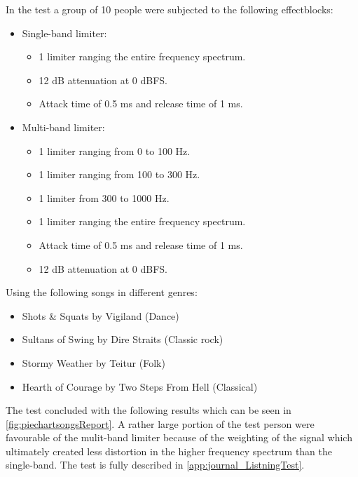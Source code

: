 In the test a group of 10 people were subjected to the following effectblocks:
 \begin{itemize}
    \item Single-band limiter:
    \begin{itemize}
    \item 1 limiter ranging the entire frequency spectrum.
    \item 12 dB attenuation at 0 dBFS.
    \item Attack time of 0.5 ms and release time of 1 ms.
    \end{itemize}
    \item Multi-band limiter:
    \begin{itemize}
    \item 1 limiter ranging from 0 to 100 Hz.
    \item 1 limiter ranging from 100 to 300 Hz.
    \item 1 limiter from 300 to 1000 Hz.
    \item 1 limiter ranging the entire frequency spectrum.
    \item Attack time of 0.5 ms and release time of 1 ms.
    \item 12 dB attenuation at 0 dBFS.
    \end{itemize}
 \end{itemize}
Using the following songs in different genres:
\begin{itemize}
\item Shots \& Squats by Vigiland (Dance)
\item Sultans of Swing by Dire Straits (Classic rock)
\item Stormy Weather by Teitur (Folk)
\item Hearth of Courage by Two Steps From Hell (Classical)
\end{itemize}
The test concluded with the following results which can be seen in \autoref{fig:piechartsongsReport}. A rather large portion of the test person were favourable of the mulit-band limiter because of the weighting of the signal which ultimately created less distortion in the higher frequency spectrum than the single-band. The test is fully described in \autoref{app:journal_ListningTest}.

